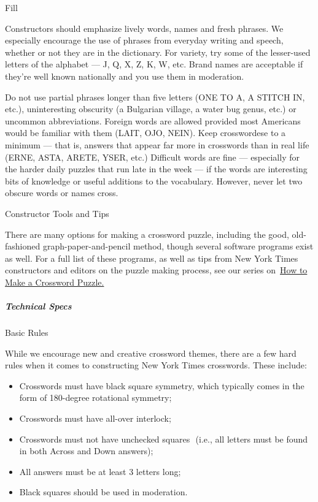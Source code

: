 Fill

Constructors should emphasize lively words, names and fresh phrases. We
especially encourage the use of phrases from everyday writing and
speech, whether or not they are in the dictionary. For variety, try some
of the lesser-used letters of the alphabet --- J, Q, X, Z, K, W, etc.
Brand names are acceptable if they're well known nationally and you use
them in moderation.

Do not use partial phrases longer than five letters (ONE TO A, A STITCH
IN, etc.), uninteresting obscurity (a Bulgarian village, a water bug
genus, etc.) or uncommon abbreviations. Foreign words are allowed
provided most Americans would be familiar with them (LAIT, OJO, NEIN).
Keep crosswordese to a minimum --- that is, answers that appear far more
in crosswords than in real life (ERNE, ASTA, ARETE, YSER, etc.)
Difficult words are fine --- especially for the harder daily puzzles
that run late in the week --- if the words are interesting bits of
knowledge or useful additions to the vocabulary. However, never let two
obscure words or names cross.

Constructor Tools and Tips

There are many options for making a crossword puzzle, including the
good, old-fashioned graph-paper-and-pencil method, though several
software programs exist as well. For a full list of these programs, as
well as tips from New York Times constructors and editors on the puzzle
making process, see our series
on~\href{https://www.nytimes.com/2018/09/14/crosswords/how-to-make-a-crossword-puzzle-the-series.html}{How
to Make a Crossword Puzzle.}

\hypertarget{technical-specs}{%
\subparagraph{Technical Specs}\label{technical-specs}}

Basic Rules

While we encourage new and creative crossword themes, there are a few
hard rules when it comes to constructing New York Times crosswords.
These include:

\begin{itemize}
\tightlist
\item
  Crosswords must have black square symmetry, which typically comes in
  the form of 180-degree rotational symmetry;
\item
  Crosswords must have all-over interlock;
\item
  Crosswords must not have unchecked squares  (i.e., all letters must be
  found in both Across and Down answers);
\item
  All answers must be at least 3 letters long;
\item
  Black squares should be used in moderation.
\end{itemize}


